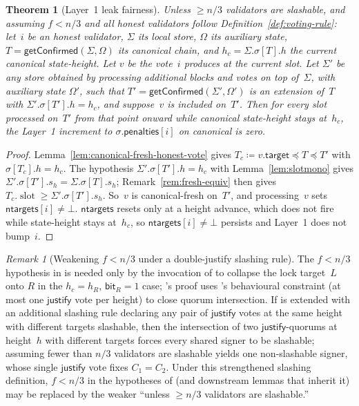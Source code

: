\ifx\litemode\undefined\documentclass{article}\fi
\newcommand{\slot}[0]{\ensuremath{\operatorname{\mathrm{slot}}}}
\newcommand{\target}{\mathsf{target}}
\newcommand{\just}{\ensuremath{\mathsf{justify}}\xspace}
\newcommand{\ntargets}{\mathsf{ntargets}}
\newcommand{\penalties}{\mathsf{penalties}}
\newcommand{\bit}{\mathsf{bit}}
\newcommand{\getConfirmed}{\textsf{getConfirmed}\xspace}
\theoremstyle{plain}
\newtheorem{theorem}{Theorem}
\theoremstyle{definition}
\theoremstyle{remark}
\newtheorem{remark}{Remark}
\begin{document}
\begin{theorem}[Layer~1 leak fairness]\label{thm:fairness}
Unless $\geq n/3$ validators are slashable, and assuming $f < n/3$ and all honest validators follow Definition~\ref{def:voting-rule}: let~$i$ be an honest validator, $\Sigma$ its local store, $\Omega$ its auxiliary state, $T = \getConfirmed(\Sigma, \Omega)$ its canonical chain, and $h_c = \Sigma.\sigma[T].h$ the current canonical state-height.
Let $v$ be the vote~$i$ produces at the current slot.
Let $\Sigma'$ be any store obtained by processing additional blocks and votes on top of~$\Sigma$, with auxiliary state $\Omega'$, such that $T' = \getConfirmed(\Sigma', \Omega')$ is an extension of~$T$ with $\Sigma'.\sigma[T'].h = h_c$, and suppose~$v$ is included on~$T'$.
Then for every slot processed on~$T'$ from that point onward while canonical state-height stays at~$h_c$, the Layer~1 increment to $\sigma.\penalties[i]$ on canonical is zero.
\end{theorem}

\begin{proof}
Lemma~\ref{lem:canonical-fresh-honest-vote} gives $T_c \coloneqq v.\target \preceq T \preceq T'$ with $\sigma[T_c].h = h_c$.
The hypothesis $\Sigma'.\sigma[T'].h = h_c$ with Lemma~\ref{lem:slotmono} gives $\Sigma'.\sigma[T'].s_h = \Sigma.\sigma[T].s_h$; Remark~\ref{rem:fresh-equiv} then gives $T_c.\slot \geq \Sigma'.\sigma[T'].s_h$.
So~$v$ is canonical-fresh on~$T'$, and processing~$v$ sets $\ntargets[i] \neq \bot$.
$\ntargets$ resets only at a height advance, which does not fire while state-height stays at~$h_c$, so $\ntargets[i] \neq \bot$ persists and Layer~1 does not bump~$i$.
\end{proof}

\begin{remark}[Weakening $f < n/3$ under a double-justify slashing rule]\label{rem:canonical-fresh-slashable}
The $f < n/3$ hypothesis in  is needed only by the invocation of  to collapse the lock target~$L$ onto $R$ in the $h_c = h_R$, $\bit_R = 1$ case; 's proof uses 's behavioural constraint (at most one \just vote per height) to close quorum intersection.
If  is extended with an additional slashing rule declaring any pair of \just votes at the same height with different targets slashable, then the intersection of two \just-quorums at height~$h$ with different targets forces every shared signer to be slashable; assuming fewer than $n/3$ validators are slashable yields one non-slashable signer, whose single \just vote fixes $C_1 = C_2$.
Under this strengthened slashing definition, $f < n/3$ in the hypotheses of  (and downstream lemmas that inherit it) may be replaced by the weaker ``unless $\geq n/3$ validators are slashable.''
\end{remark}
\end{document}
